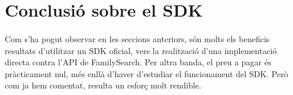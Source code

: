 \section{Conclusió sobre el SDK}

    \paragraph{}
    Com s'ha pogut observar en les seccions anteriors, són molts els beneficis resultats d'utilitzar un SDK oficial, vers la realització d'una implementació directa contra l’API de FamilySearch. Per altra banda, el preu a pagar és pràcticament nul, més enllà d'haver d'estudiar el funcionament del SDK. Però com ja hem comentat, resulta un esforç molt rendible.
